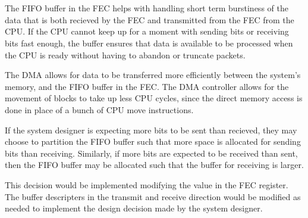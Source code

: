 \section{}

The FIFO buffer in the FEC helps with handling short term burstiness of the data
that is both recieved by the FEC and transmitted from the FEC from the CPU. If
the CPU cannot keep up for a moment with sending bits or receiving bits fast
enough, the buffer ensures that data is available to be processed when the CPU
is ready without having to abandon or truncate packets. 


The DMA allows for data to be transferred more efficiently between the system's
memory, and the FIFO buffer in the FEC. The DMA controller allows for the
movement of blocks to take up less CPU cycles, since the direct memory access is
done in place of a bunch of CPU move instructions.

If the system designer is expecting more bits to be sent than recieved, they may
choose to partition the FIFO buffer such that more space is allocated for
sending bits than receiving. Similarly, if more bits are expected to be received
than sent, then the FIFO buffer may be allocated such that the buffer for
receiving is larger. 

This decision would be implemented modifying the value in the FEC register. The
buffer descripters in the transmit and receive direction would be modified as
needed to implement the design decision made by the system designer. 


